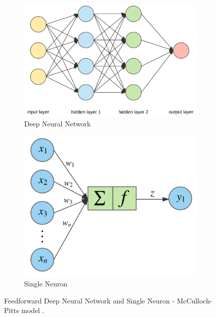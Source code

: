 \begin{figure}[b]
	\centering
	\begin{subfigure}[b]{0.4\textwidth}
		\includegraphics[width=\textwidth]{network}
		\caption{Deep Neural Network}
		\label{neural:net}
	\end{subfigure}
	\begin{subfigure}[b]{0.4\textwidth}
		\includegraphics[width=\textwidth]{neuron}
		\caption{Single Neuron}
		\label{neural:neur}
	\end{subfigure}
	\caption{Feedforward Deep Neural Network and Single Neuron - McCulloch-Pitts model \cite{dertat2017}.}
	\label{neural}
\end{figure}

